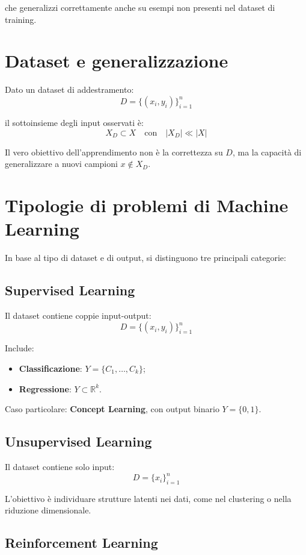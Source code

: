 \documentclass[a4paper,12pt]{report}
\begin{document}
che generalizzi correttamente anche su esempi non presenti nel dataset di training.

\section{Dataset e generalizzazione}

Dato un dataset di addestramento:
\[
D = \{(x_i, y_i)\}_{i=1}^{n}
\]

il sottoinsieme degli input osservati è:
\[
X_D \subset X \quad \text{con} \quad |X_D| \ll |X|
\]

Il vero obiettivo dell’apprendimento non è la correttezza su $D$, ma la capacità di generalizzare a nuovi campioni $x \notin X_D$.

\section{Tipologie di problemi di Machine Learning}

In base al tipo di dataset e di output, si distinguono tre principali categorie:

\subsection{Supervised Learning}

Il dataset contiene coppie input-output:
\[
D = \{(x_i, y_i)\}_{i=1}^{n}
\]

Include:
\begin{itemize}
    \item \textbf{Classificazione}: $Y = \{C_1, \dots, C_k\}$;
    \item \textbf{Regressione}: $Y \subset \mathbb{R}^k$.
\end{itemize}

Caso particolare: \textbf{Concept Learning}, con output binario $Y = \{0,1\}$.

\subsection{Unsupervised Learning}

Il dataset contiene solo input:
\[
D = \{x_i\}_{i=1}^{n}
\]

L’obiettivo è individuare strutture latenti nei dati, come nel clustering o nella riduzione dimensionale.

\subsection{Reinforcement Learning}
\end{document}
